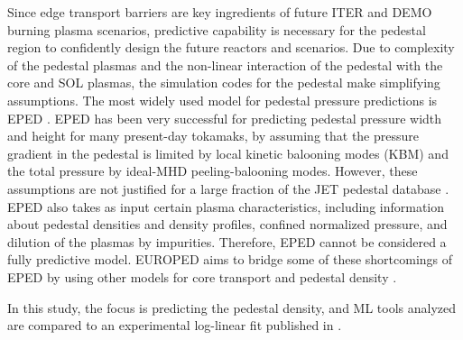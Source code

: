 \documentclass[a4paper, twoside, final, 12pt]{article}
\begin{document}
Since edge transport barriers are key ingredients of future ITER and DEMO burning plasma scenarios, predictive capability is necessary for the pedestal region to confidently design the future reactors and scenarios.
Due to complexity of the pedestal plasmas and the non-linear interaction of the pedestal with the core and SOL plasmas, the simulation codes for the pedestal make simplifying assumptions. The most widely used model for pedestal pressure predictions is EPED \cite{EPED_ELM, Snyder_2011}. 
EPED has been very successful for predicting pedestal pressure width and height for many present-day tokamaks, by assuming that the pressure gradient in the pedestal is limited by local kinetic balooning modes (KBM) and the total pressure by ideal-MHD peeling-balooning modes. However, these assumptions are not justified for a large fraction of the JET pedestal database \cite{Frassinetti_2020}. EPED also takes as input certain plasma characteristics, including information about pedestal densities and density profiles, confined normalized pressure, and dilution of the plasmas by impurities. Therefore, EPED cannot be considered a fully predictive model. EUROPED aims to bridge some of these shortcomings of EPED by using other models for core transport and pedestal density \cite{Saarelma_2017, pedestal_prediction}. 

In this study, the focus is predicting the pedestal density, and ML tools analyzed are compared to an experimental log-linear fit published in \cite{Frassinetti_2020}.
\end{document}
